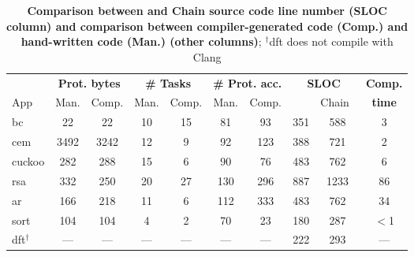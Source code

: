 
\begin{table}[t]
	\centering
	\footnotesize
	\renewcommand{\tabcolsep}{1pt}
	\begin{tabular}{|l|cc|cc|cc|cc|c|}
		\hline
		{} & \multicolumn{2}{c|}{{\bf Prot. bytes}} & \multicolumn{2}{c|}{{\bf \# Tasks}} & \multicolumn{2}{c|}{{\bf \# Prot. acc.}} & \multicolumn{2}{c|}{\bf SLOC} & {\bf Comp.} \\
		App & Man. & Comp. & Man. & Comp. & Man. & Comp. & \multicolumn{1}{l}{\sys} & \multicolumn{1}{r|}{Chain~\cite{chain}} & {\bf time} \\
		\hline\hline
		bc & 22 & 22 & 10 & 15 & 81 & 93 & 351 &588 & 3\\
		cem & 3492 & 3242 & 12 & 9 & 92 & 123 & 388 &721 & 2\\
		cuckoo & 282 & 288 & 15 & 6 & 90 & 76 & 483 &762 & 6\\
		rsa & 332 & 250 & 20 & 27 & 130 & 296 & 887 &1233 & 86\\
		ar & 166 & 218 & 11 & 6 & 112 & 333 & 483 &762 & 34\\
		sort & 104 & 104 & 4 & 2 & 70 & 23 & 180 & 287 & $<$1\\
		dft$^\dagger$ & --- & --- & --- & --- & --- & --- & 222 & 293 & ---\\
		\hline
	\end{tabular}
	\caption{\textbf{Comparison between \sys and Chain source code line number (SLOC column) and comparison between compiler-generated \sys code (Comp.) and hand-written \sys code (Man.) (other columns)}; $^\dagger$dft does not compile with Clang }\label{table:compiler_result}\vspace{-0.5cm}
\end{table}

%

